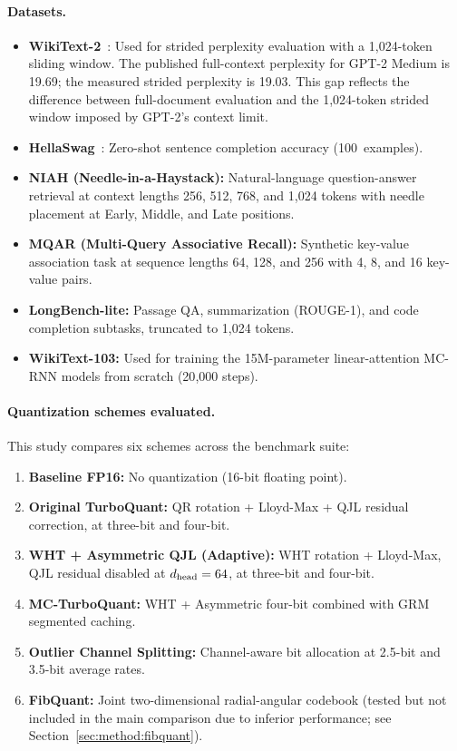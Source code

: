 \paragraph{Datasets.}
\begin{itemize}[noitemsep,topsep=1pt,parsep=0pt,partopsep=0pt]
\item \textbf{WikiText-2}~\cite{merity2017pointer}: Used for strided
  perplexity evaluation with a 1{,}024-token sliding window.
  The published full-context perplexity for GPT-2 Medium is 19.69;
  the measured strided perplexity is 19.03.
  This gap reflects the difference between full-document evaluation and
  the 1{,}024-token strided window imposed by GPT-2's context limit.
\item \textbf{HellaSwag}~\cite{zellers2019hellaswag}: Zero-shot sentence
  completion accuracy (100~examples).
\item \textbf{NIAH (Needle-in-a-Haystack):} Natural-language
  question-answer retrieval at context lengths 256, 512, 768, and 1{,}024
  tokens with needle placement at Early, Middle, and Late positions.
\item \textbf{MQAR (Multi-Query Associative Recall):} Synthetic
  key-value association task at sequence lengths 64, 128, and 256 with
  4, 8, and 16 key-value pairs.
\item \textbf{LongBench-lite:} Passage QA, summarization
  (ROUGE-1), and code completion subtasks, truncated to 1{,}024 tokens.
\item \textbf{WikiText-103:} Used for training the 15M-parameter
  linear-attention MC-RNN models from scratch (20{,}000 steps).
\end{itemize}

\paragraph{Quantization schemes evaluated.}
This study compares six schemes across the benchmark suite:
\begin{enumerate}[noitemsep,topsep=1pt,parsep=0pt,partopsep=0pt]
\item \textbf{Baseline FP16:} No quantization (16-bit floating point).
\item \textbf{Original TurboQuant:} QR rotation + Lloyd-Max + QJL
  residual correction, at three-bit and four-bit.
\item \textbf{WHT + Asymmetric QJL (Adaptive):} WHT rotation +
  Lloyd-Max, QJL residual disabled at $d_{\text{head}} = 64$, at three-bit and
  four-bit.
\item \textbf{MC-TurboQuant:} WHT + Asymmetric four-bit combined
  with GRM segmented caching.
\item \textbf{Outlier Channel Splitting:} Channel-aware bit allocation
  at 2.5-bit and 3.5-bit average rates.
\item \textbf{FibQuant:} Joint two-dimensional radial-angular codebook
  (tested but not included in the main comparison due to inferior
  performance; see Section~\ref{sec:method:fibquant}).
\end{enumerate}

